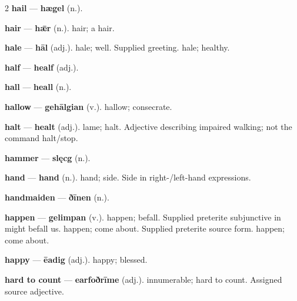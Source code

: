 \begin{multicols}{2}
\textbf{hail} — \textbf{hægel} (n.).\par
\textbf{hair} — \textbf{hǣr} (n.). hair; a hair.\par
\textbf{hale} — \textbf{hāl} (adj.). hale; well. Supplied greeting. hale; healthy.\par
\textbf{half} — \textbf{healf} (adj.).\par
\textbf{hall} — \textbf{heall} (n.).\par
\textbf{hallow} — \textbf{gehālgian} (v.). hallow; consecrate.\par
\textbf{halt} — \textbf{healt} (adj.). lame; halt. Adjective describing impaired walking; not the command halt/stop.\par
\textbf{hammer} — \textbf{slęcg} (n.).\par
\textbf{hand} — \textbf{hand} (n.). hand; side. Side in right-/left-hand expressions.\par
\textbf{handmaiden} — \textbf{ðīnen} (n.).\par
\textbf{happen} — \textbf{gelimpan} (v.). happen; befall. Supplied preterite subjunctive in might befall us. happen; come about. Supplied preterite source form. happen; come about.\par
\textbf{happy} — \textbf{ēadig} (adj.). happy; blessed.\par
\textbf{hard to count} — \textbf{earfoðrīme} (adj.). innumerable; hard to count. Assigned source adjective.\par

\end{multicols}
